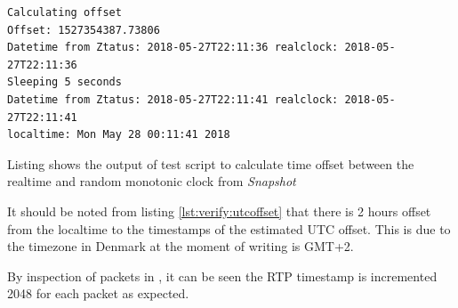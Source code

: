 \begin{listing}[H] 
\begin{verbatim}
Calculating offset
Offset: 1527354387.73806
Datetime from Ztatus: 2018-05-27T22:11:36 realclock: 2018-05-27T22:11:36
Sleeping 5 seconds
Datetime from Ztatus: 2018-05-27T22:11:41 realclock: 2018-05-27T22:11:41
localtime: Mon May 28 00:11:41 2018
\end{verbatim}
\caption{Listing shows the output of test script to calculate time offset between the realtime and random monotonic clock from \textit{Snapshot}}
\label{lst:verify:utcoffset}
\end{listing}

It should be noted from listing \ref{lst:verify:utcoffset} that there is 2 hours offset from the localtime to the timestamps of the estimated UTC offset.  This is due to the timezone in Denmark at the moment of writing is GMT+2.

\noindent{}By inspection of packets in , it can be seen the RTP timestamp is incremented 2048 for each packet as expected.


